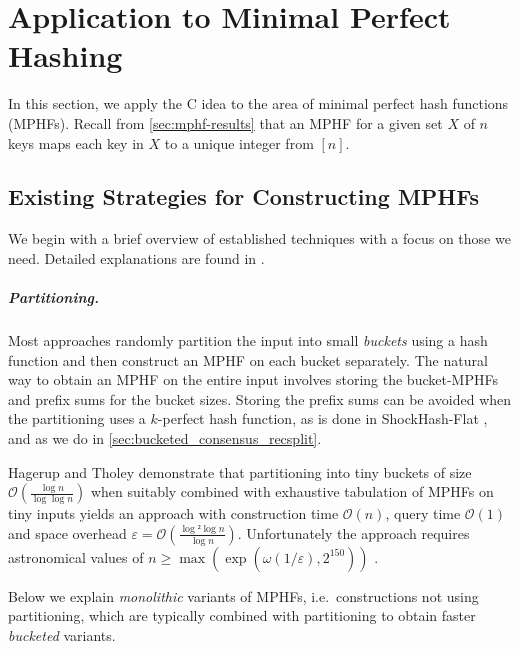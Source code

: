 \documentclass[cleveref,thm-restate]{lipics-v2021}
\def\consensus{\texorpdfstring{C\scalebox{0.8}{ONSENSUS}}{CONSENSUS}\xspace}
\begin{document}
\section{Application to Minimal Perfect Hashing}\label{s:mphf}
In this section, we apply the \consensus idea to the area of minimal perfect hash functions (MPHFs).
Recall from \cref{sec:mphf-results} that an MPHF for a given set $X$ of $n$ keys maps each key in $X$ to a unique integer from $[n]$.

\subsection{Existing Strategies for Constructing MPHFs}

We begin with a brief overview of established techniques with a focus on those we need. Detailed explanations are found in \cite{lehmann2024fast}.

\subparagraph{Partitioning.}
Most approaches randomly partition the input into small \emph{buckets} using a hash function and then construct an MPHF on each bucket separately.
The natural way to obtain an MPHF on the entire input involves storing the bucket-MPHFs and prefix sums for the bucket sizes.
Storing the prefix sums can be avoided when the partitioning uses a $k$-perfect hash function, as is done in ShockHash-Flat \cite{lehmann2024shockhash2}, and as we do in \cref{sec:bucketed_consensus_recsplit}.

Hagerup and Tholey demonstrate that partitioning into tiny buckets of size $𝒪(\frac{\log n}{\log \log n})$ when suitably combined with exhaustive tabulation of MPHFs on tiny inputs yields an approach with construction time $𝒪(n)$, query time $𝒪(1)$ and space overhead $ε = 𝒪(\frac{\log² \log n}{\log n})$. Unfortunately the approach requires astronomical values of $n ≥ \max(\exp(ω(1/ε),2^{150}))$ \cite{botelho2013practical}.

Below we explain \emph{monolithic} variants of MPHFs, i.e.\ constructions not using partitioning, which are typically combined with partitioning to obtain faster \emph{bucketed} variants.
\end{document}
